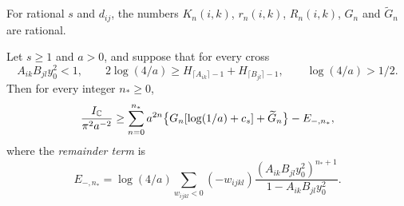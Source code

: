For rational $s$ and $d_{ij}$, the numbers $K_n(i,k)$, $r_n(i,k)$,
$R_n(i,k)$, $G_n$ and $\widetilde G_n$ are rational.

\begin{proposition}\label{pf:overlap}
Let $s\ge1$ and $a>0$, and suppose that for every cross
\begin{equation}\label{pf:cross-threshold}
 A_{ik}B_{jl}y_0^2<1,\qquad
 2\log(4/a)\ge H_{\lceil A_{ik}\rceil-1}+H_{\lceil B_{jl}\rceil-1},
 \qquad \log(4/a)>1/2 .
\end{equation}
Then for every integer $n_*\ge0$,
\begin{equation}\label{pf:collected-overlap}
 \frac{I_\mathbb C}{\pi^2a^{-2}}\ge
 \sum_{n=0}^{n_*}a^{2n}\bigl\{G_n[\log(1/a)+c_s]+\widetilde G_n\bigr\}
 -E_{-,n_*},
\end{equation}
where the \emph{remainder term} is
\[
 E_{-,n_*}=\log(4/a)\sum_{w_{ijkl}<0}(-w_{ijkl})
 \frac{(A_{ik}B_{jl}y_0^2)^{n_*+1}}{1-A_{ik}B_{jl}y_0^2}.
\]
\end{proposition}

